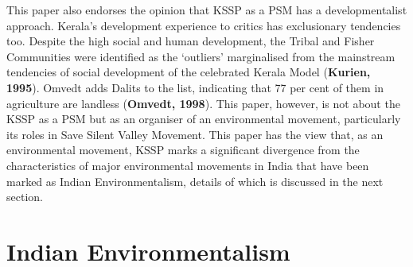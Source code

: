 \documentclass[twoside, 13pt]{article}
\begin{document}
{This paper also endorses the opinion that KSSP as a PSM has a developmentalist approach. Kerala’s development experience to critics has exclusionary tendencies too. Despite the high social and human development, the Tribal and Fisher Communities were identified as the ‘outliers’ marginalised from the mainstream tendencies of social development of the celebrated Kerala Model (\textbf{Kurien, 1995}). Omvedt adds Dalits to the list, indicating that 77 per cent of them in agriculture are landless (\textbf{Omvedt, 1998}). This paper, however, is not about the KSSP as a PSM but as an organiser of an environmental movement, particularly its roles in Save Silent Valley Movement. This paper has the view that, as an environmental movement, KSSP marks a significant divergence from the characteristics of major environmental movements in India that have been marked as Indian Environmentalism, details of which is discussed in the next section.} 

\newpage


{\fontsize{18}{20}\selectfont\section*{Indian Environmentalism}}

\vspace{-.5cm}
\end{document}
